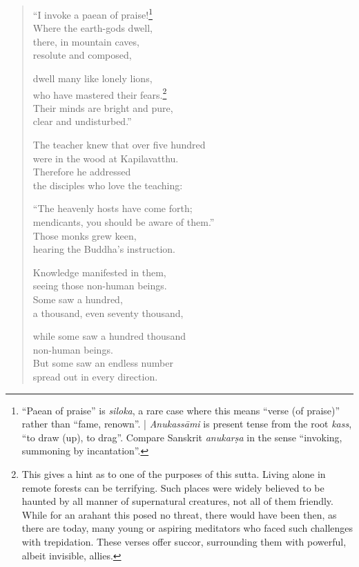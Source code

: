 \documentclass[12pt,openany]{book}%
\begin{document}
\begin{verse}%
“I invoke a paean of praise!\footnote{“Paean of praise” is \textit{siloka}, a rare case where this means “verse (of praise)” rather than “fame, renown”. | \textit{\textsanskrit{Anukassāmi}} is present tense from the root \textit{kass}, “to draw (up), to drag”. Compare Sanskrit \textit{\textsanskrit{anukarṣa}} in the sense “invoking, summoning by incantation”. } \\
Where the earth-gods dwell, \\
there, in mountain caves, \\
resolute and composed, 

dwell many like lonely lions, \\
who have mastered their fears.\footnote{This gives a hint as to one of the purposes of this sutta. Living alone in remote forests can be terrifying. Such places were widely believed to be haunted by all manner of supernatural creatures, not all of them friendly. While for an arahant this posed no threat, there would have been then, as there are today, many young or aspiring meditators who faced such challenges with trepidation. These verses offer succor, surrounding them with powerful, albeit invisible, allies. } \\
Their minds are bright and pure, \\
clear and undisturbed.” 

The teacher knew that over five hundred \\
were in the wood at Kapilavatthu. \\
Therefore he addressed \\
the disciples who love the teaching: 

“The heavenly hosts have come forth; \\
mendicants, you should be aware of them.” \\
Those monks grew keen, \\
hearing the Buddha’s instruction. 

Knowledge manifested in them, \\
seeing those non-human beings. \\
Some saw a hundred, \\
a thousand, even seventy thousand, 

while some saw a hundred thousand \\
non-human beings. \\
But some saw an endless number \\
spread out in every direction. 


\end{verse}
\end{document}
